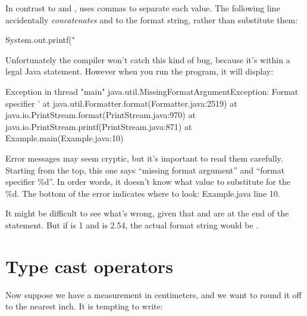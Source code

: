 In contrast to  and ,  uses commas to separate each value.
The following line accidentally {\em concatenates}  and  to the format string, rather than substitute them:

\begin{code}
System.out.printf("%
\end{code}

Unfortunately the compiler won't catch this kind of bug, because it's within a legal Java statement.
However when you run the program, it will display:


\begin{small}
\begin{stdout}
Exception in thread "main" java.util.MissingFormatArgumentException:
Format specifier '%
    at java.util.Formatter.format(Formatter.java:2519)
    at java.io.PrintStream.format(PrintStream.java:970)
    at java.io.PrintStream.printf(PrintStream.java:871)
    at Example.main(Example.java:10)
\end{stdout}
\end{small}

Error messages may seem cryptic, but it's important to read them carefully.
Starting from the top, this one says ``missing format argument'' and ``format specifier \%d''.
In order words, it doesn't know what value to substitute for the \%d.
The bottom of the error indicates where to look: Example.java line 10.

It might be difficult to see what's wrong, given that  and  are at the end of the  statement.
But if  is 1 and  is 2.54, the actual format string would be .


\section{Type cast operators}

Now suppose we have a measurement in centimeters, and we want to round it off to the nearest inch.
It is tempting to write:

